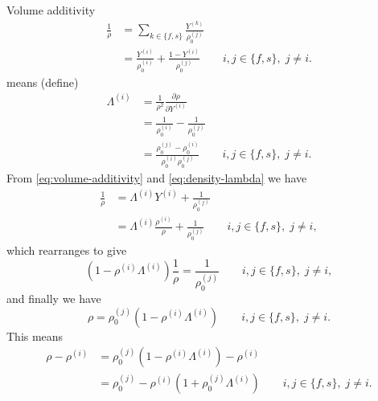 \documentclass[12pt]{report}
\begin{document}
Volume additivity
\begin{equation}\label{eq:volume-additivity}
  \begin{aligned}
    \frac{1}{\rho} &=
    \sum_{k \in \{f,s\}} \frac{Y^{(k)}}{\rho^{(j)}_0} \\
    &=
    \frac{Y^{(i)}}{\rho^{(i)}_0} +
    \frac{1 - Y^{(i)}}{\rho^{(j)}_0}
    \qquad i,j \in \{f,s\}, \; j \ne i.
  \end{aligned}
\end{equation}
means
(define)
\begin{equation}\label{eq:density-lambda}
  \begin{aligned}
    \Lambda^{(i)} &=
    \frac{1}{\rho^2} \frac{\partial \rho}{\partial Y^{(i)}} \\
    &=
    \frac{1}{\rho^{(i)}_0} -
    \frac{1}{\rho^{(j)}_0}
    \\
    &=
    \frac{\rho^{(j)}_0 - \rho^{(i)}_0}{\rho^{(i)}_0\rho^{(j)}_0}
    \qquad i,j \in \{f,s\}, \; j \ne i.
  \end{aligned}
\end{equation}
From \eqref{eq:volume-additivity} and \eqref{eq:density-lambda} we have
\begin{equation*}
  \begin{aligned}
    \frac{1}{\rho} &=
    \Lambda^{(i)} Y^{(i)} + \frac{1}{\rho^{(j)}_0} \\
    &=
    \Lambda^{(i)} \frac{\rho^{(i)}}{\rho} + \frac{1}{\rho^{(j)}_0}
    \qquad i,j \in \{f,s\}, \; j \ne i,
  \end{aligned}
\end{equation*}
which rearranges to give
\begin{equation*}
  (1 - \rho^{(i)} \Lambda^{(i)})
  \frac{1}{\rho} =
  \frac{1}{\rho^{(j)}_0}
  \qquad i,j \in \{f,s\}, \; j \ne i,
\end{equation*}
and finally we have
\begin{equation}
  \rho =
  \rho^{(j)}_0 (1 - \rho^{(i)} \Lambda^{(i)})
  \qquad i,j \in \{f,s\}, \; j \ne i.
\end{equation}
This means
\begin{equation}
  \begin{aligned}
    \rho - \rho^{(i)} &=
    \rho^{(j)}_0 (1 - \rho^{(i)} \Lambda^{(i)}) - \rho^{(i)} \\
    &=
    \rho^{(j)}_0 - \rho^{(i)}(1 + \rho^{(j)}_0 \Lambda^{(i)})
    \qquad i,j \in \{f,s\}, \; j \ne i.
  \end{aligned}
\end{equation}
\end{document}
